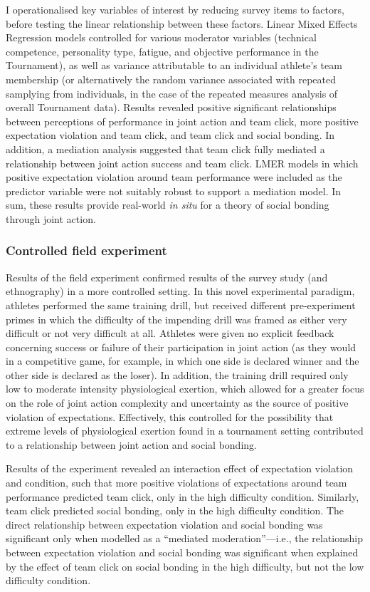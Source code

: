I operationalised key variables of interest by reducing survey items to factors, before testing the linear relationship between these factors.  Linear Mixed Effects Regression models controlled for various moderator variables (technical competence, personality type, fatigue, and objective performance in the Tournament), as well as variance attributable to an individual athlete's team membership (or alternatively the random variance associated with repeated samplying from individuals, in the case of the repeated measures analysis of overall Tournament data).  Results revealed positive significant relationships between perceptions of performance in joint action and team click, more positive expectation violation and team click, and team click and social bonding.  In addition, a mediation analysis suggested that team click fully mediated a relationship between joint action success and team click.  LMER models in which positive expectation violation around team performance were included as the predictor variable were not suitably robust to support a mediation model.  In sum, these results provide real-world \textit{in situ} for a
theory of social bonding through joint action.

\subsubsection{Controlled field experiment}
Results of the field experiment confirmed results of the survey study (and ethnography) in a more controlled setting.  In this novel experimental paradigm, athletes performed the same training drill, but received different pre-experiment primes in which the difficulty of the impending drill was framed as either very difficult or not very difficult at all.  Athletes were given no explicit feedback concerning success or failure of their participation in joint action (as they would in a competitive game, for example, in which one side is declared winner and the other side is declared as the loser). In addition, the training drill required only low to moderate intensity physiological exertion, which allowed for a greater focus on the role of joint action complexity and uncertainty as the source of positive violation of expectations.  Effectively, this controlled for the possibility that extreme levels of physiological exertion found in a tournament setting contributed to a relationship between joint action and social bonding.

Results of the experiment revealed an interaction effect of expectation violation and condition, such that more positive violations of expectations around team performance predicted team click, only in the high difficulty condition.  Similarly, team click predicted social bonding, only in the high difficulty condition.  The direct relationship between expectation violation and social bonding was significant only when modelled as a ``mediated moderation''---i.e., the relationship between expectation violation and social bonding was significant when explained by the effect of team click on social bonding in the high difficulty, but not the low difficulty condition.

